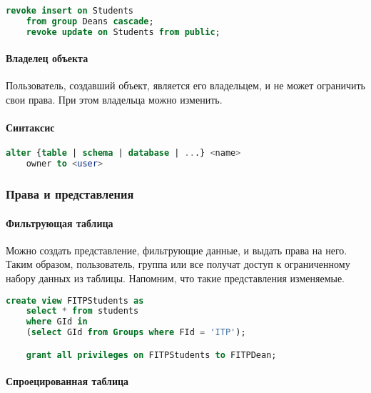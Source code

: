\begin{examples}
	\enewline
	\begin{lstlisting}[language=SQL]
    revoke insert on Students
    from group Deans cascade;
    revoke update on Students from public;
    \end{lstlisting}
\end{examples}

\paragraph{Владелец объекта}

Пользователь, создавший объект, является его владельцем, и не может ограничить свои права. При этом
владельца можно изменить.

\paragraph{Синтаксис}
\enewline

\begin{lstlisting}[language=SQL]
    alter {table | schema | database | ...} <name>
    owner to <user>
\end{lstlisting}

\subsubsection{Права и представления}

\paragraph{Фильтрующая таблица}

Можно создать представление, фильтрующие данные, и выдать права на него. Таким образом,
пользователь, группа или все получат доступ к ограниченному набору данных из таблицы. Напомним, что
такие представления изменяемые.

\begin{example}
	\enewline
	\begin{lstlisting}[language=SQL]
    create view FITPStudents as
    select * from students
    where GId in
    (select GId from Groups where FId = 'ITP');

    grant all privileges on FITPStudents to FITPDean;
    \end{lstlisting}
\end{example}

\paragraph{Спроецированная таблица}

